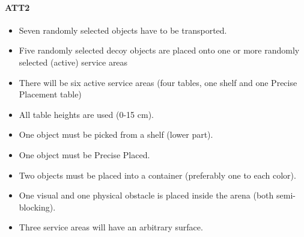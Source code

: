 \paragraph{ATT2}
\begin{itemize}
\item Seven randomly selected objects have to be transported.
\item Five randomly selected decoy objects are placed onto one or more randomly selected (active)  service areas
\item There will be six active service areas (four tables,  one shelf and one Precise Placement table)
\item All table heights are used (0-15 $\si{\centi\meter}$).
\item One object must be picked from a shelf (lower part).
\item One object must be Precise Placed.
\item Two objects must be placed into a container (preferably one to each color).
\item One visual and one physical obstacle is placed inside the arena (both semi-blocking).
\item Three service areas will have an arbitrary surface.
\end{itemize}